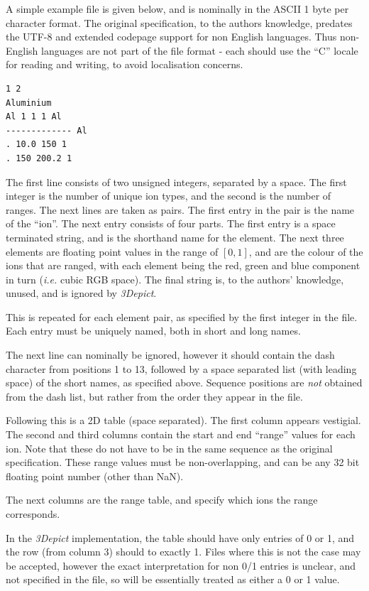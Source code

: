 \documentclass[10pt]{article}
\begin{document}
A simple example file is given below, and is nominally in the ASCII 1 byte per character format. The original specification, to the authors knowledge, predates the UTF-8 and extended codepage support for non English languages. Thus non-English languages are not part of the file format - each should use the ``C'' locale for reading and writing, to avoid localisation concerns.

\begin{table}
\begin{verbatim}
1 2
Aluminium
Al 1 1 1 Al
------------- Al
. 10.0 150 1
. 150 200.2 1
\end{verbatim}
\end{table}

The first line consists of two unsigned integers, separated by a space. The first integer is the number of unique ion types, and the second is the number of ranges. The next lines are taken as pairs. The first entry in the pair is the name of the ``ion''. The next entry consists of four parts. The first entry is a space terminated string, and is the shorthand name for the element. The next three elements are floating point values in the range of $[0,1]$, and are the colour of the ions that are ranged, with each element being the red, green and blue component in turn (\emph{i.e.} cubic RGB space). The final string is, to the authors' knowledge, unused, and is ignored by \emph{3Depict}. 

This is repeated for each element pair, as specified by the first integer in the file. Each entry must be uniquely named, both in short and long names.

The next line can nominally be ignored, however it should contain the dash character from positions 1 to 13, followed by a space separated list (with leading space) of the short names, as specified above. Sequence positions are \emph{not} obtained from the dash list, but rather from the order they appear in the file.

Following this is a 2D table (space separated). The first column appears vestigial. The second and third columns contain the start and end ``range'' values for each ion. Note that these do not have to be in the same sequence as the original specification. These range values must be non-overlapping, and can be any 32 bit floating point number (other than NaN).

The next columns are the range table, and specify which ions the range corresponds.

In the \emph{3Depict} implementation, the table should have only entries of 0 or 1, and the row  (from column 3) should to exactly 1. Files where this is not the case may be accepted, however the exact interpretation for non 0/1 entries is unclear, and not specified in the file, so will be essentially treated as either a 0 or 1 value. 
\end{document}
